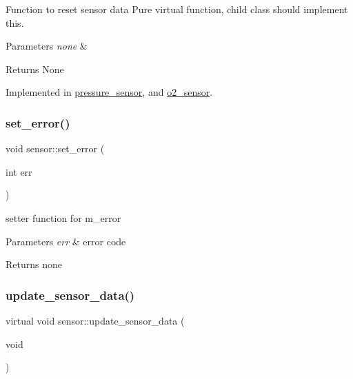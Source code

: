 Function to reset sensor data Pure virtual function, child class should implement this. 


\begin{DoxyParams}{Parameters}
{\em none} & \\
\hline
\end{DoxyParams}
\begin{DoxyReturn}{Returns}
None 
\end{DoxyReturn}


Implemented in \hyperlink{group___ventilator_module_ga19fa695e059a50b732d54d1e4325ee99}{pressure\+\_\+sensor}, and \hyperlink{group___ventilator_module_gacc2551ecc6e2b9542a747aed535eda43}{o2\+\_\+sensor}.

\mbox{\label{classsensor_af88b299557e0ac58b9fee93bfc2e5e22}} 
\subsubsection{\texorpdfstring{set\+\_\+error()}{set\_error()}}
{\footnotesize\ttfamily void sensor\+::set\+\_\+error (\begin{DoxyParamCaption}\item[{int}]{err }\end{DoxyParamCaption})\hspace{0.3cm}{\ttfamily [inline]}}



setter function for m\+\_\+error 


\begin{DoxyParams}{Parameters}
{\em err} & error code \\
\hline
\end{DoxyParams}
\begin{DoxyReturn}{Returns}
none 
\end{DoxyReturn}
\mbox{\label{classsensor_a8a8cdbc1c82a4089bf0a70f980fb37d4}} 
\subsubsection{\texorpdfstring{update\+\_\+sensor\+\_\+data()}{update\_sensor\_data()}}
{\footnotesize\ttfamily virtual void sensor\+::update\+\_\+sensor\+\_\+data (\begin{DoxyParamCaption}\item[{void}]{ }\end{DoxyParamCaption})\hspace{0.3cm}{\ttfamily [pure virtual]}}



